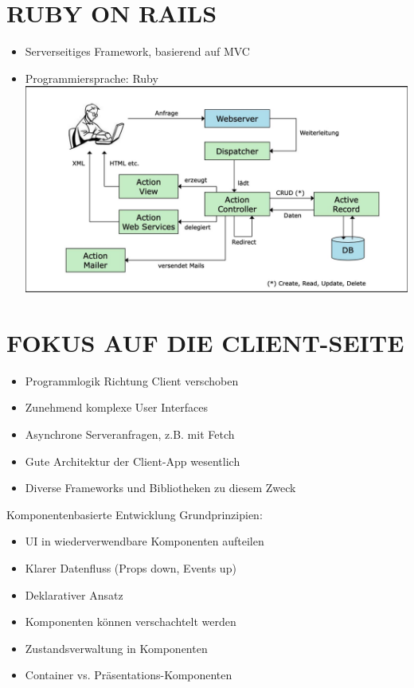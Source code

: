 \section*{RUBY ON RAILS}
\begin{itemize}
  \item Serverseitiges Framework, basierend auf MVC
  \item Programmiersprache: Ruby\\
\includegraphics[width=\linewidth]{images/2025_01_02_22162ee5453ad0230328g-09}
\end{itemize}

\section*{FOKUS AUF DIE CLIENT-SEITE}
\begin{itemize}
  \item Programmlogik Richtung Client verschoben
  \item Zunehmend komplexe User Interfaces
  \item Asynchrone Serveranfragen, z.B. mit Fetch
  \item Gute Architektur der Client-App wesentlich
  \item Diverse Frameworks und Bibliotheken zu diesem Zweck
\end{itemize}

\begin{concept}{Komponentenbasierte Entwicklung}
    Grundprinzipien:
    \begin{itemize}
        \item UI in wiederverwendbare Komponenten aufteilen
        \item Klarer Datenfluss (Props down, Events up)
        \item Deklarativer Ansatz
        \item Komponenten können verschachtelt werden
        \item Zustandsverwaltung in Komponenten
        \item Container vs. Präsentations-Komponenten
    \end{itemize}
\end{concept}

